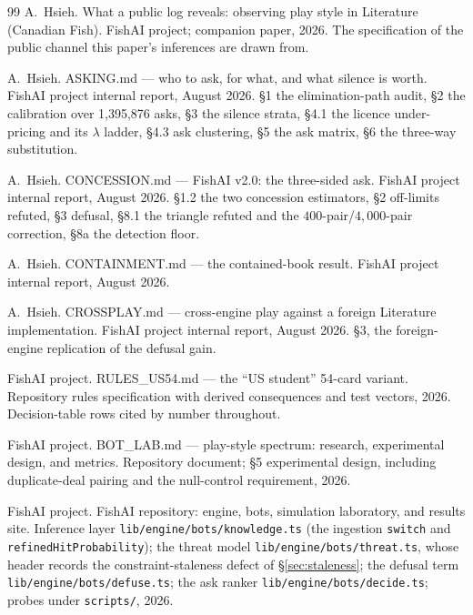 \documentclass[11pt]{article}
\newcommand{\code}[1]{\texttt{#1}}
\begin{document}
\begin{thebibliography}{99}
A.~Hsieh.
\newblock What a public log reveals: observing play style in Literature (Canadian Fish).
\newblock FishAI project; companion paper, 2026. The specification of the public channel
this paper's inferences are drawn from.

A.~Hsieh.
\newblock ASKING.md --- who to ask, for what, and what silence is worth.
\newblock FishAI project internal report, August 2026. \S1 the elimination-path audit,
\S2 the calibration over 1{,}395{,}876 asks, \S3 the silence strata, \S4.1 the licence
under-pricing and its $\lambda$ ladder, \S4.3 ask clustering, \S5 the ask matrix, \S6 the
three-way substitution.

A.~Hsieh.
\newblock CONCESSION.md --- FishAI v2.0: the three-sided ask.
\newblock FishAI project internal report, August 2026. \S1.2 the two concession
estimators, \S2 off-limits refuted, \S3 defusal, \S8.1 the triangle refuted and the
$400$-pair/$4{,}000$-pair correction, \S8a the detection floor.

A.~Hsieh.
\newblock CONTAINMENT.md --- the contained-book result.
\newblock FishAI project internal report, August 2026.

A.~Hsieh.
\newblock CROSSPLAY.md --- cross-engine play against a foreign Literature implementation.
\newblock FishAI project internal report, August 2026. \S3, the foreign-engine replication
of the defusal gain.

FishAI project.
\newblock RULES\_US54.md --- the ``US student'' 54-card variant.
\newblock Repository rules specification with derived consequences and test vectors, 2026.
Decision-table rows cited by number throughout.

FishAI project.
\newblock BOT\_LAB.md --- play-style spectrum: research, experimental design, and metrics.
\newblock Repository document; \S5 experimental design, including duplicate-deal pairing
and the null-control requirement, 2026.

FishAI project.
\newblock FishAI repository: engine, bots, simulation laboratory, and results site.
\newblock Inference layer \code{lib/engine/bots/knowledge.ts} (the ingestion \code{switch}
and \code{refinedHitProbability}); the threat model
\code{lib/engine/bots/threat.ts}, whose header records the constraint-staleness defect of
\S\ref{sec:staleness}; the defusal term \code{lib/engine/bots/defuse.ts}; the ask ranker
\code{lib/engine/bots/decide.ts}; probes under \code{scripts/}, 2026.

\end{thebibliography}
\end{document}
